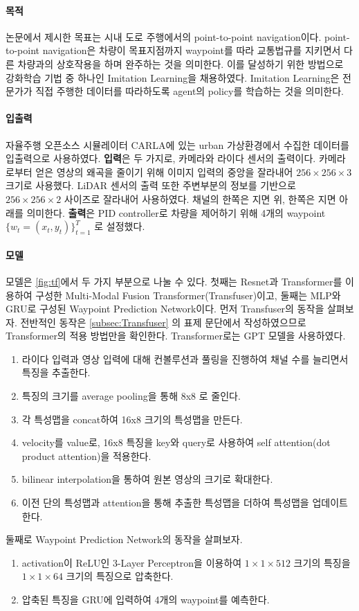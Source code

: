 \paragraph*{목적} 논문에서 제시한 목표는 시내 도로 주행에서의 point-to-point navigation이다.
point-to-point navigation은 차량이 목표지점까지
waypoint를 따라
교통법규를 지키면서
다른 차량과의 상호작용을 하며
완주하는 것을 의미한다.
이를 달성하기 위한 방법으로 강화학습 기법 중 하나인 Imitation Learning을 채용하였다.
Imitation Learning은 전문가가 직접 주행한 데이터를 따라하도록 agent의 policy를 학습하는 것을 의미한다.

\paragraph*{입출력} 자율주행 오픈소스 시뮬레이터 CARLA\cite{CARLA}에 있는 urban 가상환경에서 수집한 데이터를 입출력으로 사용하였다.
\textbf{입력}은 두 가지로, 카메라와 라이다 센서의 출력이다.
카메라로부터 얻은 영상의 왜곡을 줄이기 위해 이미지 입력의 중앙을 잘라내어 $256 \times 256 \times 3$  크기로 사용했다.
LiDAR 센서의 출력 또한 주변부분의 정보를 기반으로 $256 \times 256 \times 2$ 사이즈로 잘라내어 사용하였다.
채널의 한쪽은 지면 위, 한쪽은 지면 아래를 의미한다.
\textbf{출력}은 PID controller로 차량을 제어하기 위해 4개의 waypoint $\{w_t = (x_t, y_t)\}_{t=1}^T$ 로 설정했다.

\paragraph*{모델}
모델은 \autoref{fig:tf}에서 두 가지 부분으로 나눌 수 있다.
첫째는 Resnet과 Transformer를 이용하여 구성한 Multi-Modal Fusion Transformer(Transfuser)이고,
둘째는 MLP와 GRU로 구성된 Waypoint Prediction Network이다.
먼저 Transfuser의 동작을 살펴보자.
전반적인 동작은 \autoref{subsec:Transfuser} 의 표제 문단에서 작성하였으므로 Transformer의 적용 방법만을 확인한다.
Transformer로는 GPT 모델을 사용하였다.
\begin{enumerate}\tightlist
    \item 라이다 입력과 영상 입력에 대해 컨볼루션과 풀링을 진행하여 채널 수를 늘리면서 특징을 추출한다.
    \item 특징의 크기를 average pooling을 통해 8x8 로 줄인다.
    \item 각 특성맵을 concat하여 16x8 크기의 특성맵을 만든다.
    \item velocity를 value로, 16x8 특징을 key와 query로 사용하여 self attention(dot product attention)을 적용한다.
    \item bilinear interpolation을 통하여 원본 영상의 크기로 확대한다.
    \item 이전 단의 특성맵과 attention을 통해 추출한 특성맵을 더하여 특성맵을 업데이트한다.
\end{enumerate}
둘째로 Waypoint Prediction Network의 동작을 살펴보자.
\begin{enumerate}\tightlist
    \item activation이 ReLU인 3-Layer Perceptron을 이용하여
    $1 \times 1 \times 512$ 크기의 특징을
    $1 \times 1 \times 64$ 크기의 특징으로 압축한다.
    \item 압축된 특징을 GRU에 입력하여 4개의 waypoint를 예측한다.
\end{enumerate}
